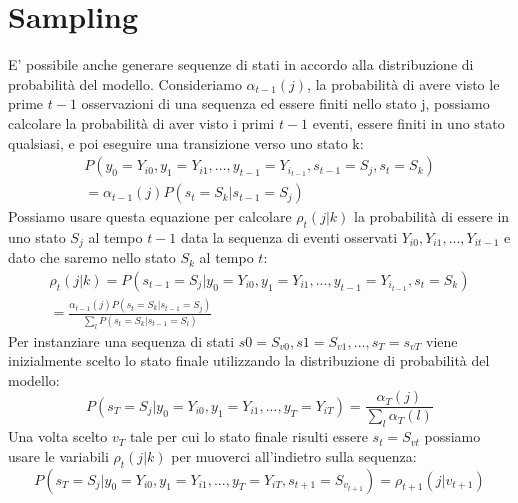 \section{Sampling}
E' possibile anche generare sequenze di stati in accordo alla distribuzione di probabilità del modello. Consideriamo $\alpha_{t-1}(j)$, la probabilità di avere visto le prime $t - 1$ osservazioni di una sequenza ed essere finiti nello stato j, possiamo calcolare la probabilità di aver visto i primi $t - 1$ eventi, essere finiti in uno stato qualsiasi, e poi eseguire una transizione verso uno stato k:
\begin{equation}
\begin{aligned}
P(y_0 = Y_{i0}, y_1 = Y_{i1}, ...,y_{t-1}=Y_{i_{t-1}},s_{t-1}=S_j, s_t=S_k) \\
	=\alpha_{t-1}(j)P(s_t=S_k|s_{t-1}=S_j)
\end{aligned}
\end{equation}
Possiamo usare questa equazione per calcolare $\rho_t(j|k)$ la probabilità di essere in uno stato $S_j$ al tempo $t-1$ data la sequenza di eventi osservati $Y_{i0}, Y_{i1},...,Y_{i{t-1}}$ e dato che saremo nello stato $S_k$ al tempo $t$:
\begin{equation}
\begin{aligned}
\rho_t(j|k)=P(s_{t-1}=S_j|y_0 = Y_{i0}, y_1 = Y_{i1}, ...,y_{t-1}=Y_{i_{t-1}}, s_t=S_k) \\
= \frac{\alpha_{t-1}(j)P(s_t=S_k|s_{t-1}=S_j)}{\sum_{l}P(s_t=S_k|s_{t-1}=S_l)}
\end{aligned}
\end{equation}
Per instanziare una sequenza di stati $s0=S_{v0},s1=S_{v1},...,s_T=s_{vT}$ viene inizialmente scelto lo stato finale utilizzando la distribuzione di probabilità del modello:
\begin{equation}
P(s_T=S_j|y_0=Y_{i0},y_1=Y_{i1},...,y_T=Y_{iT}) = \frac{\alpha_T(j)}{\sum_l\alpha_T(l)}
\end{equation}
Una volta scelto $v_T$ tale per cui lo stato finale risulti essere $s_t=S_{vt}$ possiamo usare le variabili $\rho_t(j|k)$ per muoverci all'indietro sulla sequenza:
\begin{equation}
P(s_T=S_j|y_0=Y_{i0},y_1=Y_{i1},...,y_T=Y_{iT}, s_{t+1}=S_{v_{t+1}}) = \rho_{t+1}(j|v_{t+1})
\end{equation}
